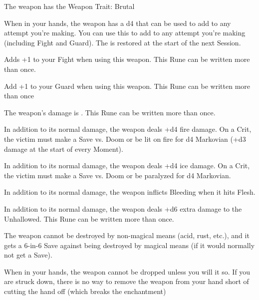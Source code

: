 {\begin{multicols}{2}

The weapon has the Weapon Trait: Brutal


When in your hands, the weapon has a d4 \UD that can be used to add to any \RO attempt you're making. You can use this \UD to add to any \RO attempt you're making (including Fight and Guard).  The \UD is restored at the start of the next Session.





Adds +1 to your Fight \RO when using this weapon.  This Rune can be written more than once.



Add +1 to your Guard \RO when using this weapon.  This Rune can be written more than once



The weapon's damage is \DCUP.  This Rune can be written more than once.



In addition to its normal damage, the weapon deals +d4 fire damage.  On a Crit, the victim must make a Save vs. Doom or be lit on fire for d4 Markovian (+d3 damage at the start of every Moment).



In addition to its normal damage, the weapon deals +d4 ice damage.  On a Crit, the victim must make a Save vs. Doom or be paralyzed for d4 Markovian.



In addition to its normal damage, the weapon inflicts Bleeding when it hits Flesh.








In addition to its normal damage, the weapon deals +d6 extra damage to the Unhallowed.  This Rune can be written more than once.



The weapon cannot be destroyed by non-magical means (acid, rust, etc.), and it gets a 6-in-6 Save against being destroyed by magical means (if it would normally not get a Save).


When in your hands, the weapon cannot be dropped unless you will it so.  If you are struck down, there is no way to remove the weapon from your hand short of cutting the hand off (which breaks the enchantment)



\end{multicols}}
